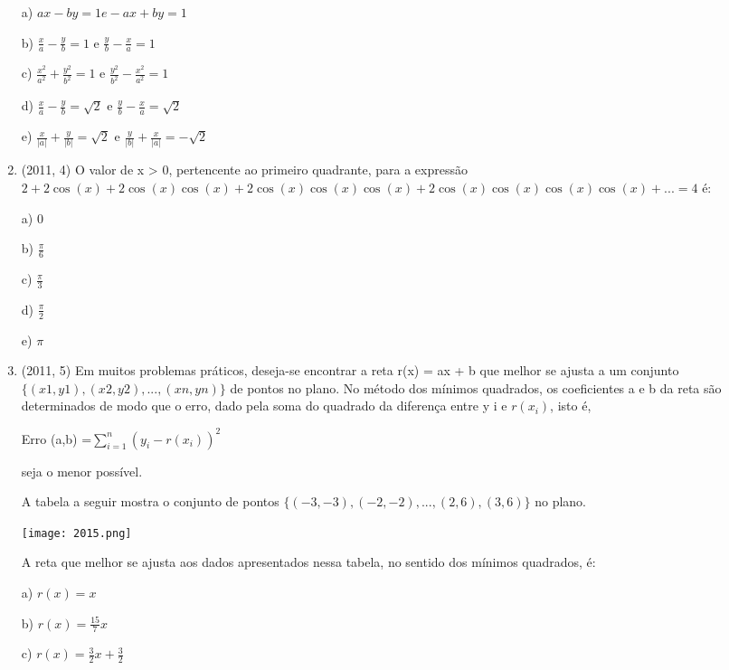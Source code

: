 \documentclass{article}
\begin{document}
\begin{enumerate}
a) $ax - by = 1 e -ax + by = 1$

b) $\frac{x}{a} - \frac{y}{b} = 1$ e $\frac{y}{b} - \frac{x}{a} =1$

c) $\frac{x^2}{a^2} + \frac{y^2}{b^2} = 1$ e $\frac{y^2}{b^2} - \frac{x^2}{a^2} =1$

d) $\frac{x}{a} - \frac{y}{b} = \sqrt{2}$ e $\frac{y}{b} - \frac{x}{a} =\sqrt{2}$

e) $\frac{x}{|a|} + \frac{y}{|b|} = \sqrt{2}$ e $\frac{y}{|b|} + \frac{x}{|a|} =-\sqrt{2}$\newline








\item(2011, 4) O valor de x > 0, pertencente ao primeiro quadrante, para a expressão $2 + 2\cos(x) + 2\cos(x)\cos(x) + 2\cos(x)\cos(x)\cos(x) + 2\cos(x)\cos(x)\cos(x)\cos(x) + ... = 4$ é:

a) 0

b) $\frac{\pi}{6}$

c) $\frac{\pi}{3}$

d) $\frac{\pi}{2}$

e) $\pi$\newline






\item(2011, 5) Em muitos problemas práticos, deseja-se encontrar a reta r(x) = ax + b que melhor se ajusta a um conjunto $\{(x 1 , y 1 ), (x 2 , y 2 ), ..., (x n , y n )\}$ de pontos no plano. No método dos mínimos quadrados, os coeficientes a e b da reta são determinados de modo que o erro, dado pela soma do quadrado da diferença entre y i e $r(x_i )$, isto é,

Erro (a,b) =$\sum_{i=1}^n (y_i -r(x_i))^2$

seja o menor possível.

A tabela a seguir mostra o conjunto de pontos $\{(-3, -3), (-2, -2), ..., (2, 6), (3, 6)\}$ no plano.


\texttt{[image: 2015.png]}\newline


A reta que melhor se ajusta aos dados apresentados nessa tabela, no sentido dos mínimos quadrados, é:

a) $r(x) = x$

b) $r(x) =\frac{15}{7}x$

c) $r(x) = \frac{3}{2}x + \frac{3}{2}$


\end{enumerate}
\end{document}
